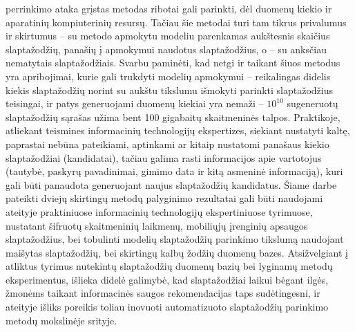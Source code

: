 \documentclass{VUMIFInfBakalaurinis}
\begin{document}
perrinkimo ataka grįstas metodas ribotai gali parinkti, dėl duomenų kiekio ir 
aparatinių kompiuterinių resursų. Tačiau šie metodai turi tam tikrus privalumus 
ir skirtumus -- su  metodo apmokytu modeliu parenkamas 
aukštesnis skaičius slaptažodžių, panašių į apmokymui naudotus slaptažodžius, o 
 -- su anksčiau nematytais slaptažodžiais. Svarbu paminėti, 
kad netgi ir taikant šiuos metodus yra apribojimai, kurie gali trukdyti modelių 
apmokymui -- reikalingas didelis kiekis slaptažodžių norint su aukštu tikslumu 
išmokyti parinkti slaptažodžius teisingai, ir patys generuojami duomenų kiekiai 
yra nemaži -- $10^{10}$ sugeneruotų slaptažodžių sąrašas užima bent 100 
gigabaitų skaitmeninės talpos. Praktikoje, atliekant teismines informacinių 
technologijų ekspertizes, siekiant nustatyti kaltę, paprastai nebūna pateikiami, 
aptinkami ar kitaip nustatomi panašaus kiekio slaptažodžiai (kandidatai), tačiau 
galima rasti informacijos apie vartotojus (tautybė, paskyrų pavadinimai, gimimo 
data ir kitą asmeninė informaciją), kuri gali būti panaudota generuojant naujus 
slaptažodžių kandidatus. Šiame darbe pateikti dviejų skirtingų metodų palyginimo 
rezultatai gali būti naudojami ateityje praktiniuose informacinių technologijų 
ekspertiniuose tyrimuose, nustatant šifruotų skaitmeninių laikmenų, mobiliųjų 
įrenginių apsaugos slaptažodžius, bei tobulinti modelių slaptažodžių parinkimo 
tikslumą naudojant maišytas slaptažodžių, bei skirtingų kalbų žodžių duomenų 
bazes. Atsižvelgiant į atliktus tyrimus nutekintų slaptažodžių duomenų bazių bei 
lyginamų metodų eksperimentus, išlieka didelė galimybė, kad slaptažodžiai laikui 
bėgant ilgės, žmonėms taikant informacinės saugos rekomendacijas taps 
sudėtingesni, ir ateityje išliks poreikis toliau inovuoti automatizuoto 
slaptažodžių parinkimo metodų mokslinėje srityje.
\end{document}
